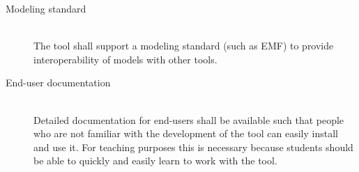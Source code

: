 \begin{description}
	\item[Modeling standard] ~\\
		The tool shall support a modeling standard (such as EMF) to provide interoperability of models with other tools.

	\item[End-user documentation] ~\\
		Detailed documentation for end-users shall be available such that people who are not familiar with the development of the tool can easily install and use it.
		For teaching purposes this is necessary because students should be able to quickly and easily learn to work with the tool.
\end{description}
